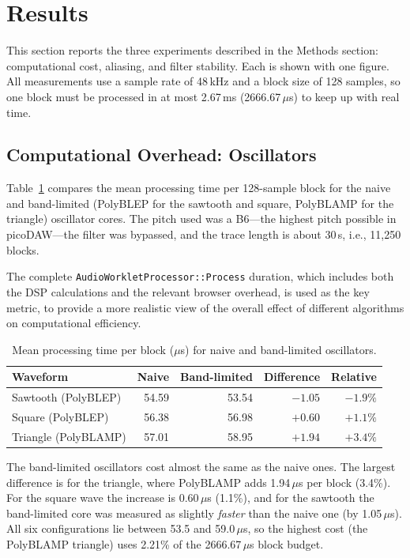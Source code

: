 \providecommand{\todo}[1]{\textbf{[TODO: #1]}}

\section{Results}
\noindent
This section reports the three experiments described in the Methods section: computational cost, aliasing, and filter stability. Each is shown with one figure. All measurements use a sample rate of 48\,kHz and a block size of 128 samples, so one block must be processed in at most 2.67\,ms (2666.67\,$\mu$s) to keep up with real time.

\subsection{Computational Overhead: Oscillators}
\label{sec:res_cpu_osc}
\noindent
Table~\ref{tab:cpu_osc} compares the mean processing time per 128-sample block for the naive and band-limited (PolyBLEP for the sawtooth and square, PolyBLAMP for the triangle) oscillator cores. The pitch used was a B6---the highest pitch possible in picoDAW---the filter was bypassed, and the trace length is about 30\,s, i.e., 11{,}250 blocks. 

The complete \texttt{AudioWorkletProcessor::Process} duration, which includes both the DSP calculations and the relevant browser overhead, is used as the key metric, to provide a more realistic view of the overall effect of different algorithms on computational efficiency.

\begin{table}[htbp]
  \centering
  \caption{Mean processing time per block ($\mu$s) for naive and band-limited oscillators.}
  \label{tab:cpu_osc}
  \begin{tabular}{lrrrr}
    \hline
    Waveform & Naive & Band-limited & Difference & Relative \\
    \hline
    Sawtooth (PolyBLEP)  & 54.59 & 53.54 & $-1.05$ & $-1.9\%$ \\
    Square (PolyBLEP)    & 56.38 & 56.98 & $+0.60$ & $+1.1\%$ \\
    Triangle (PolyBLAMP) & 57.01 & 58.95 & $+1.94$ & $+3.4\%$ \\
    \hline
  \end{tabular}
\end{table}

The band-limited oscillators cost almost the same as the naive ones. The largest difference is for the triangle, where PolyBLAMP adds 1.94\,$\mu$s per block (3.4\%). For the square wave the increase is 0.60\,$\mu$s (1.1\%), and for the sawtooth the band-limited core was measured as slightly \emph{faster} than the naive one (by 1.05\,$\mu$s). All six configurations lie between 53.5 and 59.0\,$\mu$s, so the highest cost (the PolyBLAMP triangle) uses 2.21\% of the 2666.67\,$\mu$s block budget.

